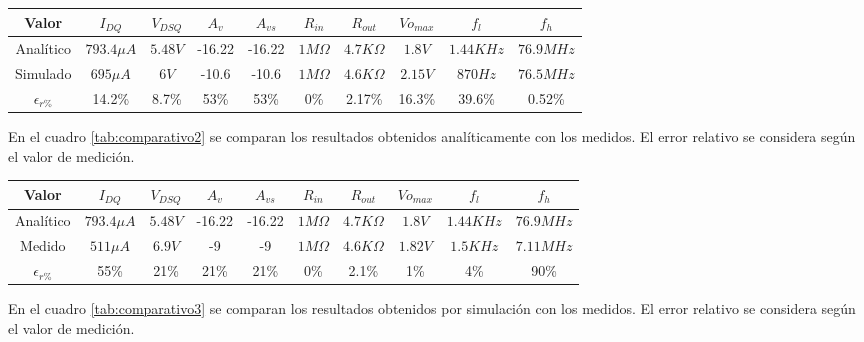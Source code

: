 \documentclass[a4paper, 10pt, spanish]{article}
\begin{document}
\begin{center}
  \begin{tabular}{|c|c|c|c|c|c|c|c|c|c|}
    \hline
    Valor & $I_{DQ}$ & $V_{DSQ}$ & $A_v$ & $A_{vs}$ & $R_{in}$ & $R_{out}$ & $V{o_{max}}$ & $f_l$ & $f_h$ \\
    \hline
    Analítico & $793.4\mu A$& $5.48V$& -16.22 & -16.22 & $1M\Omega$ & $4.7K\Omega$ & $1.8V$ & $1.44KHz$ & $76.9MHz$ \\
    \hline
    Simulado & $695\mu A$ & $6V$ & -10.6 & -10.6 & $1M\Omega$ & $4.6K\Omega$ & $2.15V$ & $870Hz$ & $76.5MHz$ \\
    \hline
    $\epsilon_{r\%}$ & 14.2\% & 8.7\% & 53\% & 53\% & 0\% & 2.17\% & 16.3\% & 39.6\% & 0.52\% \\
    \hline
  \end{tabular}
  \label{tab:comparativo1}
\end{center}

En el cuadro \ref{tab:comparativo2} se comparan los resultados obtenidos analíticamente con los medidos. El error relativo se considera según el valor de medición.

\begin{center}
  \begin{tabular}{|c|c|c|c|c|c|c|c|c|c|}
    \hline
    Valor & $I_{DQ}$ & $V_{DSQ}$ & $A_v$ & $A_{vs}$ & $R_{in}$ & $R_{out}$ & $V{o_{max}}$ & $f_l$ & $f_h$ \\
    \hline
    Analítico & $793.4\mu A$& $5.48V$& -16.22 & -16.22 & $1M\Omega$ & $4.7K\Omega$ & $1.8V$ & $1.44KHz$ & $76.9MHz$ \\
    \hline
    Medido & $511\mu A$ & $6.9V$ & -9 & -9 & $1M\Omega$ & $4.6K\Omega$ & $1.82V$ & $1.5KHz$ & $7.11MHz$ \\
    \hline
    $\epsilon_{r\%}$ & 55\% & 21\% & 21\% & 21\% & 0\% & 2.1\% & 1\% & 4\% & 90\% \\
    \hline
  \end{tabular}
  \label{tab:comparativo2}
\end{center}

En el cuadro \ref{tab:comparativo3} se comparan los resultados obtenidos por simulación con los medidos. El error relativo se considera según el valor de medición.
\end{document}
